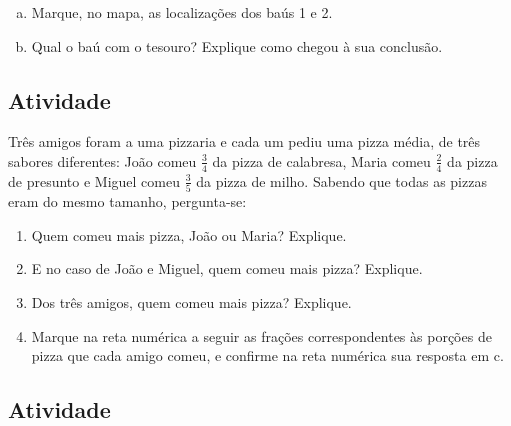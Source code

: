 \begin{enumerate}[a)]
 \item Marque, no mapa, as localizações dos baús 1 e 2.
 \item Qual o baú com o tesouro? Explique como chegou à sua conclusão. 
\end{enumerate}

\subsection{Atividade}

Três amigos foram a uma pizzaria e cada um pediu uma pizza média, de três sabores diferentes: João comeu $\frac{3}{4}$ da pizza de calabresa, Maria comeu  $\frac{2}{4}$ da pizza de presunto e Miguel comeu $\frac{3}{5}$ da pizza de milho. Sabendo que todas as pizzas eram do mesmo tamanho, pergunta-se:
\begin{enumerate} [\quad a)] %
  \item     Quem comeu mais pizza, João ou Maria? Explique.
  \item     E no caso de João e Miguel, quem comeu mais pizza? Explique.
  \item     Dos três amigos, quem comeu mais pizza? Explique.
  \item     Marque na reta numérica a seguir as frações correspondentes às porções de pizza que cada amigo comeu, e confirme na reta numérica sua resposta em c.
\end{enumerate} %

\begin{center}
\end{center}


\subsection{Atividade}

